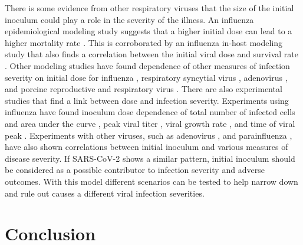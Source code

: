 There is some evidence from other respiratory viruses that the size of the initial inoculum could play a role in the severity of the illness. An influenza epidemiological modeling study suggests that a higher initial dose can lead to a higher mortality rate \citep{paulo10}. This is corroborated by an influenza in-host modeling study that also finds a correlation between the initial viral dose and survival rate \citep{price15}. Other modeling studies have found dependence of other measures of infection severity on initial dose for influenza \citep{moore20}, respiratory syncytial virus \citep{wethington19}, adenovirus \citep{li14}, and porcine reproductive and respiratory virus \citep{go19}. There are also experimental studies that find a link between dose and infection severity. Experiments using influenza have found inoculum dose dependence of total number of infected cells and area under the curve \citep{manicassamy10}, peak viral titer \citep{ginsberg52,iida63,ottolini05}, viral growth rate \citep{ginsberg52}, and time of viral peak \citep{iida63,ginsberg52}. Experiments with other viruses, such as adenovirus \citep{prince93}, and parainfluenza \citep{ottolini96}, have also shown correlations between initial inoculum and various measures of disease severity. If SARS-CoV-2 shows a similar pattern, initial inoculum should be considered as a possible contributor to infection severity and adverse outcomes. With this model different scenarios can be tested to help narrow down and rule out causes a different viral infection severities. 

\section{Conclusion}

